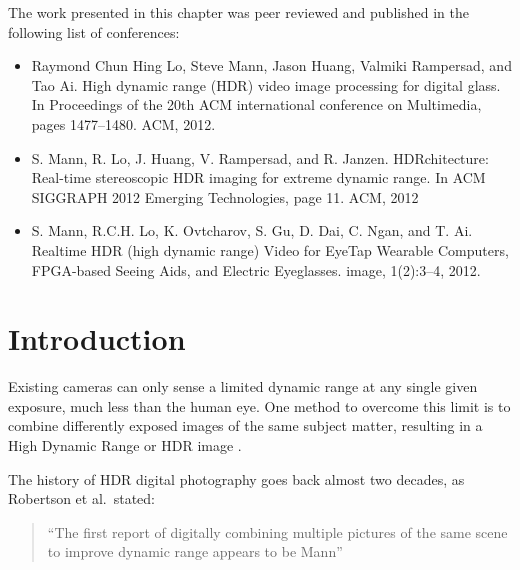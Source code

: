 The work presented in this chapter was peer reviewed and published in the following list of 
conferences: 

\begin{itemize}
\item
Raymond Chun Hing Lo, Steve Mann, Jason Huang, Valmiki Rampersad, and Tao Ai. High dynamic 
range (HDR) video image processing for digital glass. In Proceedings of the 20th ACM international 
conference on Multimedia, pages 1477--1480. ACM, 2012.
\cite{lo2012high}
\item
S. Mann, R. Lo, J. Huang, V. Rampersad, and R. Janzen. HDRchitecture: Real-time stereoscopic 
HDR imaging for extreme dynamic range. In ACM SIGGRAPH 2012 Emerging Technologies, page 
11. ACM, 2012
\cite{mann2012hdrchitecture}
\item
S. Mann, R.C.H. Lo, K. Ovtcharov, S. Gu, D. Dai, C. Ngan, and T. Ai. Realtime HDR (high dynamic 
range) Video for EyeTap Wearable Computers, FPGA-based Seeing Aids, and Electric Eyeglasses. 
image, 1(2):3--4, 2012.
\cite{mann2012realtime}
\end{itemize}

\section{Introduction}

Existing cameras can only sense a limited dynamic range at any single given exposure, much less 
than the human eye. One method to overcome this limit is to combine differently exposed images of 
the same subject matter, resulting in a High Dynamic Range or HDR image \cite{mannist, comparam,
  robertson2003estimation, kang2003high}. 
  
The history of HDR digital photography goes back almost two decades, as Robertson et al.\ 
stated\cite{robertson2003estimation}:
\begin{quote}
  ``The first report of digitally combining multiple pictures of the
  same scene to improve dynamic range appears to be
  Mann\cite{mannist}''
\end{quote}

